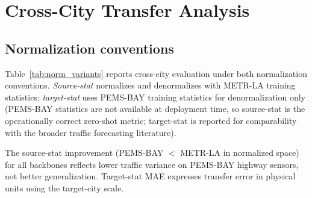 \section{Cross-City Transfer Analysis}
\label{sec:appendix_city_group}

\subsection{Normalization conventions}
\label{sec:appendix_protocol}

Table~\ref{tab:norm_variants} reports cross-city evaluation under both normalization
conventions.
\emph{Source-stat} normalizes and denormalizes with METR-LA training statistics;
\emph{target-stat} uses PEMS-BAY training statistics for denormalization only
(PEMS-BAY statistics are not available at deployment time, so source-stat is the
operationally correct zero-shot metric; target-stat is reported for comparability
with the broader traffic forecasting literature).

\begin{table}[h]
\centering
\caption{Cross-city MAE under two normalization conventions, using target
adjacency for DCRNN/STGCN (not the source-only main comparison).
Source-stat: METR-LA train mean/std for both normalization and denormalization
(lower = PEMS-BAY traffic is statistically simpler in normalized space).
Target-stat: PEMS-BAY train statistics for denormalization (interpretable mph units).
Mean $\pm$ population std over 5 random 207-node subsets and 3 model seeds.}
\label{tab:norm_variants}
\vskip 0.1in
\end{table}

The source-stat improvement (PEMS-BAY $<$ METR-LA in normalized space) for all
backbones reflects lower traffic variance on PEMS-BAY highway sensors, not better
generalization. Target-stat MAE expresses transfer error in physical units using the target-city scale.

